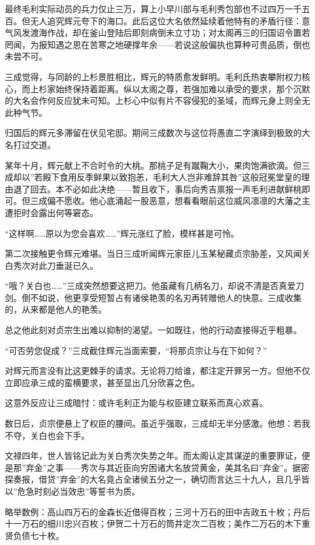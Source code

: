 \documentclass[
]{book}
\begin{document}
最终毛利实际动员的兵力仅止三万，算上小早川部与毛利秀包部也不过四万一千五百。但无人追究辉元夸下的海口。此后这位大名依然延续着他特有的矛盾行径：意气风发渡海作战，却在釜山登陆后即刻病倒未立寸功；对太阁再三的归国诏令置若罔闻，为报知遇之恩在苦寒之地硬撑年余------若说这般偏执也算种可贵品质，倒也未尝不可。

三成觉得，与同龄的上杉景胜相比，辉元的特质愈发鲜明。毛利氏热衷攀附权力核心，而上杉家始终保持着距离。纵以太阁之尊，若强加难以承受的要求，那个沉默的大名会作何反应犹未可知。上杉心中似有片不容侵犯的圣域，而辉元身上则全无此种气节。

归国后的辉元多滞留在伏见宅邸。期间三成数次与这位将愚直二字演绎到极致的大名打过交道。

某年十月，辉元献上不合时令的大桃。那桃子足有蹴鞠大小，果肉饱满欲滴。但三成却以''若殿下食用反季鲜果以致抱恙，毛利大人岂非难辞其咎''这般冠冕堂皇的理由退了回去。本不必如此决绝------暂且收下，事后向秀吉禀报一声毛利进献鲜桃即可。但三成偏不愿收。他心底涌起一股恶意，想看看眼前这位威风凛凛的大藩之主遭拒时会露出何等窘态。

``这样啊\ldots\ldots 原以为您会喜欢\ldots\ldots{}''辉元涨红了脸，模样甚是可怜。

第二次接触更令辉元难堪。当日三成听闻辉元家臣儿玉某秘藏贞宗胁差，又风闻关白秀次对此刀垂涎已久。

``哦？关白也\ldots\ldots{}''三成突然想要这把刀。他虽藏有几柄名刀，却说不清是否真爱刀剑。倒不如说，他更享受短暂占有诸侯艳羡的名刃再转赠他人的快意。三成收集的，从来都是他人的艳羡。

总之他此刻对贞宗生出难以抑制的渴望。一如既往，他的行动直接得近乎粗暴。

``可否劳您促成？''三成截住辉元当面索要，``将那贞宗让与在下如何？''

对辉元而言没有比这更棘手的请求。无论将刀给谁，都注定开罪另一方。但他不仅立即应承三成的蛮横要求，甚至显出几分欣喜之色。

这意外反应让三成暗忖：或许毛利正为能与权臣建立联系而真心欢喜。

数日后，贞宗便悬上了权臣的腰间。虽近乎强取，三成却无半分感激。他想：若我不夺，关白也会下手。

文禄四年，世人皆铭记此为关白秀次失势之年。而太阁认定其谋逆的重要罪证，便是那''弃金''之事------秀次与其近臣向穷困诸大名放贷黄金，美其名曰''弃金''。据密探奏报，借贷''弃金''的大名竟占全诸侯五分之一，确切而言达三十九人，且几乎皆以''危急时刻必当效忠''等誓书为质。

略举数例：高山四万石的金森长近借得百枚；三河十万石的田中吉政五十枚；丹后十一万石的细川忠兴百枚；伊贺二十万石的筒井定次二百枚；美作二万石的木下重贤负债七十枚。
\end{document}

